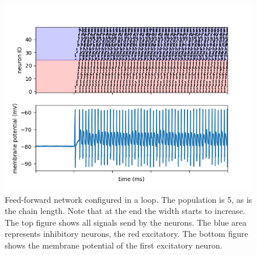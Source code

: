 \documentclass[a4paper,twocolumn]{article}
\begin{document}
\begin{figure}
    \centering
    \includegraphics[width=.5\textwidth]{figures/feedforward-signals-loop.png}
    \caption{Feed-forward network configured in a loop. The population is 5, as
        is the chain length. Note that at the end the width starts to increase.
        The top figure shows all signals send by the neurons. The blue area
        represents inhibitory neurons, the red excitatory. The bottom figure
        shows the membrane potential of the first excitatory neuron.}
    \label{fig:feed-forward-loop}
\end{figure}
\end{document}
